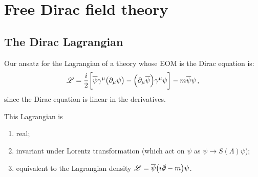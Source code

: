 \documentclass[main.tex]{subfiles}
\begin{document}
\section{Free Dirac field theory}

\subsection{The Dirac Lagrangian}


Our ansatz for the Lagrangian of a theory whose EOM is the Dirac equation is: 
%
\begin{align}
\mathscr{L} = \frac{i}{2} \qty[\overline{\psi} \gamma^{\mu } \qty(\partial_{\mu } \psi )
- \qty(\partial_{\mu } \overline{\psi}) \gamma^{\mu } \psi ]
- m \overline{\psi} \psi 
\,,
\end{align}
%
since the Dirac equation is linear in the derivatives.

\begin{claim}
This Lagrangian is \begin{enumerate}
    \item real; 
    \item invariant under Lorentz transformation (which act on \(\psi \) as \(\psi \to S(\Lambda ) \psi \));
    \item equivalent to the Lagrangian density \(\mathscr{L} = \overline{\psi} \qty(i \slashed{\partial} - m) \psi \). 
\end{enumerate}
\end{claim}
\end{document}
